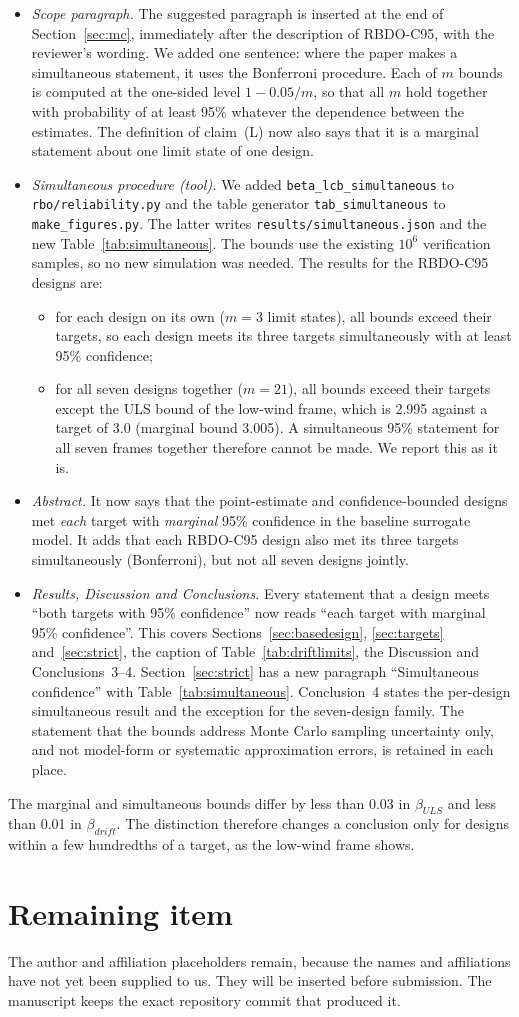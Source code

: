 \documentclass[11pt]{article}
\begin{document}
\begin{itemize}[itemsep=0.15em]
\item \emph{Scope paragraph.} The suggested paragraph is inserted at the end of Section~\ref{sec:mc},
immediately after the description of RBDO-C95, with the reviewer's wording. We added one sentence:
where the paper makes a simultaneous statement, it uses the Bonferroni procedure. Each of $m$ bounds
is computed at the one-sided level $1-0.05/m$, so that all $m$ hold together with probability of at
least 95\% whatever the dependence between the estimates. The definition of claim~(L) now also says
that it is a marginal statement about one limit state of one design.
\item \emph{Simultaneous procedure (tool).} We added \texttt{beta\_lcb\_simultaneous} to
\texttt{rbo/reliability.py} and the table generator \texttt{tab\_simultaneous} to
\texttt{make\_figures.py}. The latter writes \texttt{results/simultaneous.json} and the new
Table~\ref{tab:simultaneous}. The bounds use the existing $10^6$ verification samples, so no new
simulation was needed. The results for the RBDO-C95 designs are:
\begin{itemize}[itemsep=0.1em]
\item for each design on its own ($m=3$ limit states), all bounds exceed their targets, so each design
meets its three targets simultaneously with at least 95\% confidence;
\item for all seven designs together ($m=21$), all bounds exceed their targets except the ULS bound of
the low-wind frame, which is 2.995 against a target of 3.0 (marginal bound 3.005). A simultaneous
95\% statement for all seven frames together therefore cannot be made. We report this as it is.
\end{itemize}
\item \emph{Abstract.} It now says that the point-estimate and confidence-bounded designs met
\emph{each} target with \emph{marginal} 95\% confidence in the baseline surrogate model. It adds that
each RBDO-C95 design also met its three targets simultaneously (Bonferroni), but not all seven designs
jointly.
\item \emph{Results, Discussion and Conclusions.} Every statement that a design meets ``both targets
with 95\% confidence'' now reads ``each target with marginal 95\% confidence''. This covers
Sections~\ref{sec:basedesign}, \ref{sec:targets} and~\ref{sec:strict}, the caption of
Table~\ref{tab:driftlimits}, the Discussion and Conclusions~3--4. Section~\ref{sec:strict} has a new
paragraph ``Simultaneous confidence'' with Table~\ref{tab:simultaneous}. Conclusion~4 states the
per-design simultaneous result and the exception for the seven-design family. The statement that the
bounds address Monte Carlo sampling uncertainty only, and not model-form or systematic approximation
errors, is retained in each place.
\end{itemize}
The marginal and simultaneous bounds differ by less than 0.03 in $\beta_{ULS}$ and less than 0.01 in
$\beta_{drift}$. The distinction therefore changes a conclusion only for designs within a few
hundredths of a target, as the low-wind frame shows.

\section*{Remaining item}
The author and affiliation placeholders remain, because the names and affiliations have not yet
been supplied to us. They will be inserted before submission. The manuscript keeps the exact
repository commit that produced it.
\end{document}
